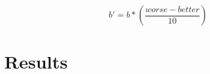 \begin{equation}
	\label{equ:opponentModel1}
	b' = b * (\frac{worse - better}{10})
\end{equation}

\section{Results}

